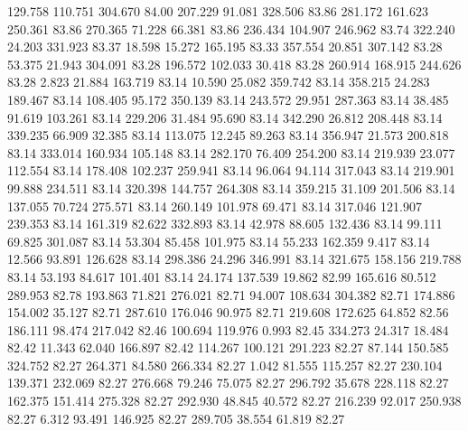  129.758  110.751  304.670        84.00
 207.229   91.081  328.506        83.86
 281.172  161.623  250.361        83.86
 270.365   71.228   66.381        83.86
 236.434  104.907  246.962        83.74
 322.240   24.203  331.923        83.37
  18.598   15.272  165.195        83.33
 357.554   20.851  307.142        83.28
  53.375   21.943  304.091        83.28
 196.572  102.033   30.418        83.28
 260.914  168.915  244.626        83.28
   2.823   21.884  163.719        83.14
  10.590   25.082  359.742        83.14
 358.215   24.283  189.467        83.14
 108.405   95.172  350.139        83.14
 243.572   29.951  287.363        83.14
  38.485   91.619  103.261        83.14
 229.206   31.484   95.690        83.14
 342.290   26.812  208.448        83.14
 339.235   66.909   32.385        83.14
 113.075   12.245   89.263        83.14
 356.947   21.573  200.818        83.14
 333.014  160.934  105.148        83.14
 282.170   76.409  254.200        83.14
 219.939   23.077  112.554        83.14
 178.408  102.237  259.941        83.14
  96.064   94.114  317.043        83.14
 219.901   99.888  234.511        83.14
 320.398  144.757  264.308        83.14
 359.215   31.109  201.506        83.14
 137.055   70.724  275.571        83.14
 260.149  101.978   69.471        83.14
 317.046  121.907  239.353        83.14
 161.319   82.622  332.893        83.14
  42.978   88.605  132.436        83.14
  99.111   69.825  301.087        83.14
  53.304   85.458  101.975        83.14
  55.233  162.359    9.417        83.14
  12.566   93.891  126.628        83.14
 298.386   24.296  346.991        83.14
 321.675  158.156  219.788        83.14
  53.193   84.617  101.401        83.14
  24.174  137.539   19.862        82.99
 165.616   80.512  289.953        82.78
 193.863   71.821  276.021        82.71
  94.007  108.634  304.382        82.71
 174.886  154.002   35.127        82.71
 287.610  176.046   90.975        82.71
 219.608  172.625   64.852        82.56
 186.111   98.474  217.042        82.46
 100.694  119.976    0.993        82.45
 334.273   24.317   18.484        82.42
  11.343   62.040  166.897        82.42
 114.267  100.121  291.223        82.27
  87.144  150.585  324.752        82.27
 264.371   84.580  266.334        82.27
   1.042   81.555  115.257        82.27
 230.104  139.371  232.069        82.27
 276.668   79.246   75.075        82.27
 296.792   35.678  228.118        82.27
 162.375  151.414  275.328        82.27
 292.930   48.845   40.572        82.27
 216.239   92.017  250.938        82.27
   6.312   93.491  146.925        82.27
 289.705   38.554   61.819        82.27
